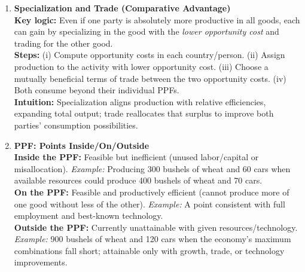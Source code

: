 \documentclass[12pt]{article}
\begin{document}
\begin{enumerate}
\item \textbf{Specialization and Trade (Comparative Advantage)} \\
\textbf{Key logic:} Even if one party is absolutely more productive in all goods, each can gain by specializing in the good with the \emph{lower opportunity cost} and trading for the other good. \\
\textbf{Steps:} (i) Compute opportunity costs in each country/person. (ii) Assign production to the activity with lower opportunity cost. (iii) Choose a mutually beneficial terms of trade between the two opportunity costs. (iv) Both consume beyond their individual PPFs. \\
\textbf{Intuition:} Specialization aligns production with relative efficiencies, expanding total output; trade reallocates that surplus to improve both parties' consumption possibilities.

\item \textbf{PPF: Points Inside/On/Outside} \\
\textbf{Inside the PPF:} Feasible but inefficient (unused labor/capital or misallocation). \emph{Example:} Producing 300 bushels of wheat and 60 cars when available resources could produce 400 bushels of wheat and 70 cars. \\
\textbf{On the PPF:} Feasible and productively efficient (cannot produce more of one good without less of the other). \emph{Example:} A point consistent with full employment and best-known technology. \\
\textbf{Outside the PPF:} Currently unattainable with given resources/technology. \emph{Example:} 900 bushels of wheat and 120 cars when the economy's maximum combinations fall short; attainable only with growth, trade, or technology improvements.

\end{enumerate}
\end{document}
